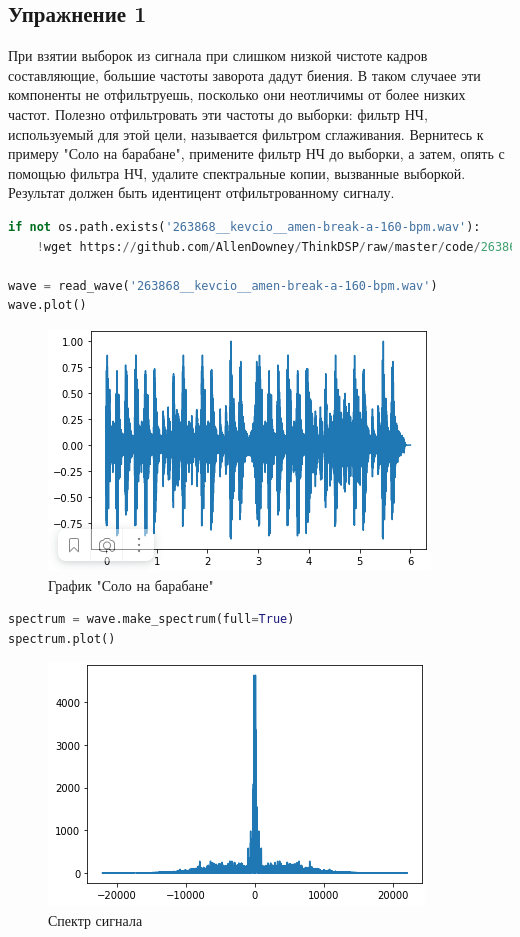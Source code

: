 \subsection{Упражнение 1}

При взятии выборок из сигнала при слишком низкой чистоте кадров составляющие, большие частоты заворота дадут биения. В таком случаее эти компоненты не отфильтруешь, посколько они неотличимы от более низких частот. Полезно отфильтровать эти частоты до выборки: фильтр НЧ, используемый для этой цели, называется фильтром сглаживания. Вернитесь к примеру "Соло на барабане", примените фильтр НЧ до выборки, а затем, опять с помощью фильтра НЧ, удалите спектральные копии, вызванные выборкой. Результат должен быть идентицент отфильтрованному сигналу.

\begin{lstlisting}[language=Python]
if not os.path.exists('263868__kevcio__amen-break-a-160-bpm.wav'):
    !wget https://github.com/AllenDowney/ThinkDSP/raw/master/code/263868__kevcio__amen-break-a-160-bpm.wav
    
wave = read_wave('263868__kevcio__amen-break-a-160-bpm.wav')
wave.plot()
\end{lstlisting}
\begin{figure}[H]
	\begin{center}
		\includegraphics[scale=1]{fig/lab11/lab11_1.png}
		\caption{График "Соло на барабане"}
	\end{center}
\end{figure}

\begin{lstlisting}[language=Python]
spectrum = wave.make_spectrum(full=True)
spectrum.plot()
\end{lstlisting}
\begin{figure}[H]
	\begin{center}
		\includegraphics[scale=1]{fig/lab11/lab11_2.png}
		\caption{Спектр сигнала}
	\end{center}
\end{figure}

